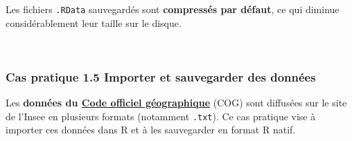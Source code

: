 \documentclass[12pt,twosided, notitlepage]{book}
\begin{document}
Les fichiers \texttt{.RData} sauvegardés sont \textbf{compressés par
défaut}, ce qui diminue considérablement leur taille sur le disque.

~

\hypertarget{cas-pratique-1.5-importer-et-sauvegarder-des-donnees}{%
\subsubsection{\texorpdfstring{\textbf{Cas pratique 1.5} Importer et
sauvegarder des
données}{Cas pratique 1.5 Importer et sauvegarder des données}}\label{cas-pratique-1.5-importer-et-sauvegarder-des-donnees}}


Les \textbf{données du
\href{https://www.insee.fr/fr/information/2666684}{Code officiel
géographique}} (COG) sont diffusées sur le site de l'Insee en plusieurs
formats (notamment \texttt{.txt}). Ce cas pratique vise à importer ces
données dans R et à les sauvegarder en format R natif.
\end{document}
